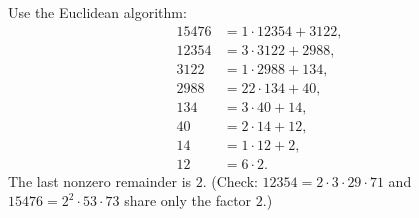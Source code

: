 Use the Euclidean algorithm:
\[
\begin{aligned}
15476&=1\cdot12354+3122,\\
12354&=3\cdot3122+2988,\\
3122&=1\cdot2988+134,\\
2988&=22\cdot134+40,\\
134&=3\cdot40+14,\\
40&=2\cdot14+12,\\
14&=1\cdot12+2,\\
12&=6\cdot2 .
\end{aligned}
\]
The last nonzero remainder is $\boxed{2}$. (Check: $12354=2\cdot3\cdot29\cdot71$ and $15476=2^2\cdot53\cdot73$ share only the factor $2$.)
